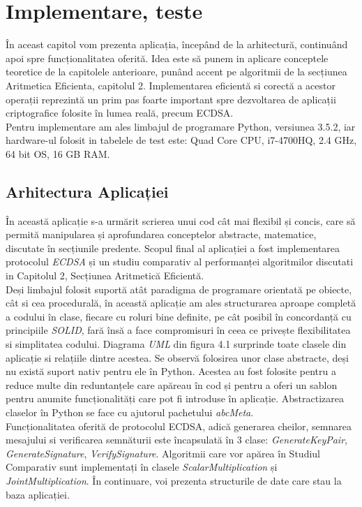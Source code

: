 \chapter{Implementare, teste}

În aceast capitol vom prezenta aplicația, începând de la arhitectură, continuând apoi spre funcționalitatea oferită. Idea este să punem in aplicare conceptele teoretice de la capitolele anterioare, punând accent pe algoritmii de la secțiunea Aritmetica Eficienta, capitolul 2. Implementarea eficientă si corectă a acestor operații reprezintă un prim pas foarte important spre dezvoltarea de aplicații criptografice folosite în lumea reală, precum ECDSA.
\\ Pentru implementare am ales limbajul de programare Python, versiunea 3.5.2, iar hardware-ul folosit in tabelele de test este: Quad Core CPU, i7-4700HQ, 2.4 GHz, 64 bit OS, 16 GB RAM.

\section{Arhitectura Aplicației}
În această aplicație s-a urmărit scrierea unui cod cât mai flexibil și concis, care să permită manipularea și aprofundarea conceptelor abstracte, matematice, discutate în secțiunile predente. Scopul final al aplicației a fost implementarea protocolul \textit{ECDSA} și un studiu comparativ al performanței algoritmilor discutati in Capitolul 2, Secțiunea Aritmetică Eficientă. \\
Deși limbajul folosit suportă atât paradigma de programare orientată pe obiecte, cât si cea procedurală, în această aplicație am ales structurarea aproape completă a codului în clase, fiecare cu roluri bine definite, pe cât posibil în concordanță cu principiile \textit{SOLID}\cite{solid}, fară însă a face compromisuri în ceea ce privește flexibilitatea si simplitatea codului. Diagrama \textit{UML}\cite{uml} din figura 4.1 surprinde toate clasele din aplicație si relațiile dintre acestea. Se observă folosirea unor clase abstracte, deși nu există suport nativ pentru ele în Python. Acestea au fost folosite pentru a reduce multe din reduntanțele care apăreau în cod și pentru a oferi un sablon pentru anumite funcționalități care pot fi introduse în aplicație. Abstractizarea claselor în Python se face cu ajutorul pachetului \textit{abcMeta}\cite{abcMeta}.\\
Funcționalitatea oferită de protocolul ECDSA, adică generarea cheilor, semnarea mesajului si verificarea semnăturii este încapsulată în 3 clase: \textit{GenerateKeyPair}, \textit{GenerateSignature}, \textit{VerifySignature}. Algoritmii care vor apărea în Studiul Comparativ sunt implementați în clasele \textit{ScalarMultiplication} și \textit{JointMultiplication}. În continuare, voi prezenta structurile de date care stau la baza aplicației.

